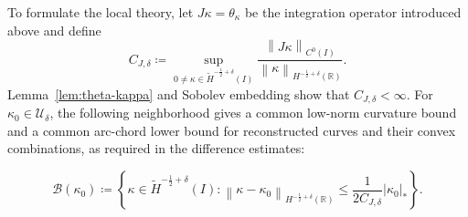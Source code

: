 \documentclass[11pt,reqno]{amsart}
\theoremstyle{plain}
\theoremstyle{definition}
\numberwithin{equation}{section}
\newcommand{\mc}[1]{\mathcal{#1}}
\newcommand{\wt}[1]{\widetilde{#1}}
\newcommand{\abs}[1]{\left\lvert #1 \right\rvert}
\newcommand{\norm}[1]{\left\lVert #1 \right\rVert}
\newcommand{\R}{\mathbb{R}}
\newcommand{\thk}{\theta_\kappa}
\newcommand{\ci}[1]{C^{#1}(I)}
\newcommand{\thi}[1]{\wt H^{#1}(I)}
\newcommand{\hr}[1]{H^{#1}(\R)}
\begin{document}
To formulate the local theory, let $J\kappa=\thk$ be the
integration operator introduced above and define
\begin{equation}
    C_{J,\delta}
    \coloneqq
    \sup_{0\neq\kappa\in\thi{-\frac12+\delta}}
    \frac{\norm{J\kappa}_{\ci{0}}}
    {\norm{\kappa}_{\hr{-\frac12+\delta}}}.
\end{equation}
Lemma~\ref{lem:theta-kappa} and Sobolev embedding show that
$C_{J,\delta}<\infty$.
For $\kappa_0\in\mc U_\delta$, the following neighborhood gives a common
low-norm curvature bound and a common arc-chord lower bound for reconstructed
curves and their convex combinations, as required in the difference estimates:

\begin{equation}\label{eqn:Bkappa0}
\mc B(\kappa_0) \coloneqq \left\{\kappa\in \thi{-\frac{1}{2}+\delta}: \norm{\kappa-\kappa_0}_{\hr{-\frac{1}{2}+\delta}}\le \frac{1}{2C_{J,\delta}}\abs{\kappa_0}_* \right\}.
\end{equation}
\end{document}
